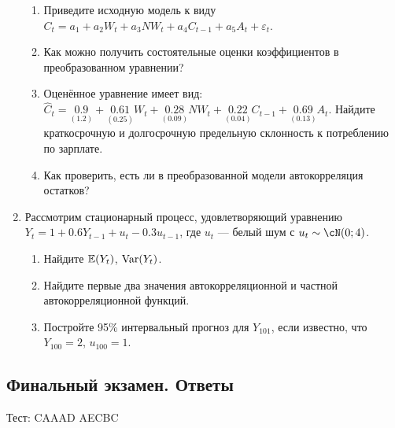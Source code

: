 \begin{enumerate}
\begin{enumerate}
	\item Приведите исходную модель к виду $C_t = a_1 + a_2 W_t + a_3 NW_t + a_4 C_{t-1} + a_5 A_t + \varepsilon_t$.
	\item Как можно получить состоятельные оценки коэффициентов в преобразованном уравнении?
	\item Оценённое уравнение имеет вид:
	$\hat C_t = \underset{(1.2)}{0.9} + \underset{(0.25)}{0.61}W_t + \underset{(0.09)}{0.28}NW_t + \underset{(0.04)}{0.22}C_{t-1} + \underset{(0.13)}{0.69}A_t$.
	Найдите краткосрочную и долгосрочную предельную склонность к потреблению по зарплате. 
	\item Как проверить, есть ли в преобразованной модели автокорреляция остатков?
\end{enumerate}

\item Рассмотрим стационарный процесс, удовлетворяющий уравнению $Y_t = 1 + 0.6Y_{t-1} + u_t - 0.3 u_{t-1}$, 
где $u_t$ — белый шум с $u_t \sim \cN(0; 4)$.

\begin{enumerate}
	\item Найдите $\mathbb{E}(Y_t)$, $\operatorname{Var}(Y_t)$.
	\item Найдите первые два значения автокорреляционной и частной автокорреляционной функций.
	\item Постройте 95\% интервальный прогноз для $Y_{101}$, если известно, что $Y_{100} = 2$, $u_{100}=1$.
\end{enumerate}

\end{enumerate}

\subsection{Финальный экзамен. Ответы}

Тест: CAAAD AECBC

